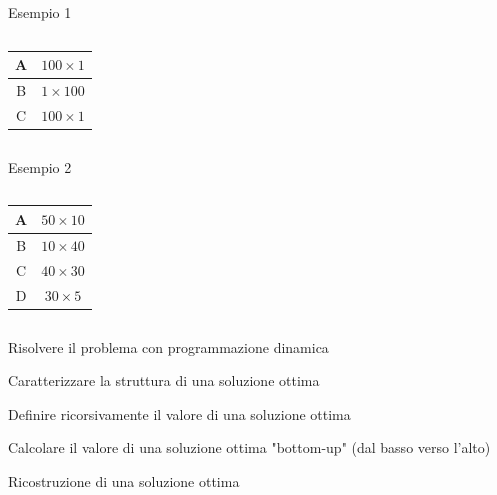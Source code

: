 \begin{frame}{Esempio 1}
    
\begin{columns}[T]
\begingroup
\setlength\arrayrulewidth{1pt}
\begin{tabular}{|c|c|}
\hline
A & $100 \times 1$ \\\hline
B & $1 \times 100$ \\\hline
C & $100 \times 1$ \\\hline
\end{tabular}    
\endgroup
{}
\vspace{-16pt}    
\end{columns}

\end{frame}

\begin{frame}{Esempio 2}

\begin{columns}[T]
\begingroup
\setlength\arrayrulewidth{1pt}
\begin{tabular}{|c|c|}
\hline
A & $50 \times 10$ \\\hline
B & $10 \times 40$ \\\hline
C & $40 \times 30$ \\\hline
D & $30 \times 5$ \\\hline
\end{tabular}    
\endgroup
{}
\vspace{-16pt}    
\end{columns}

\end{frame}

\begin{frame}{Risolvere il problema con programmazione dinamica}

\BIL 
\item Caratterizzare la \alert{struttura} di una soluzione ottima
\item Definire ricorsivamente il \alert{valore} di una soluzione ottima
\item Calcolare il \alert{valore} di una soluzione ottima "bottom-up" (dal basso verso l'alto)
\item Ricostruzione di una soluzione ottima 
\EIL

\end{frame}


